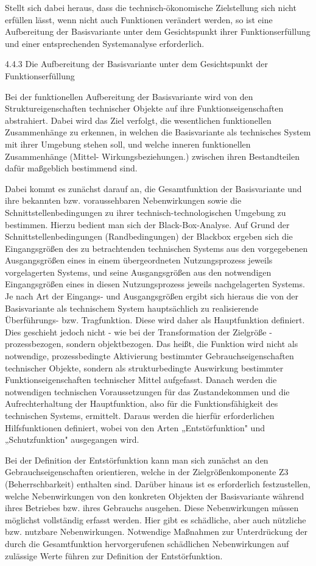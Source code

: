 \documentclass[12pt,a4paper]{article}
\begin{document}
Stellt sich dabei heraus, dass die technisch-ökonomische Zielstellung sich nicht erfüllen lässt, wenn nicht auch Funktionen verändert werden, so ist eine Aufbereitung der Basisvariante unter dem Gesichtspunkt ihrer Funktionserfüllung und einer entsprechenden Systemanalyse erforderlich.


4.4.3  Die Aufbereitung der Basisvariante unter dem Gesichtspunkt der Funktionserfüllung

Bei der funktionellen Aufbereitung der Basisvariante wird von den Struktureigenschaften technischer Objekte auf ihre Funktionseigenschaften abstrahiert. Dabei wird das Ziel verfolgt, die wesentlichen funktionellen Zusammenhänge zu erkennen, in welchen die Basisvariante als technisches System mit ihrer Umgebung stehen soll, und welche inneren funktionellen Zusammenhänge (Mittel- Wirkungsbeziehungen.) zwischen ihren Bestandteilen dafür maßgeblich bestimmend sind.

Dabei kommt es zunächst darauf an, die Gesamtfunktion der Basisvariante und ihre bekannten bzw. voraussehbaren Nebenwirkungen sowie die Schnittstellenbedingungen zu ihrer technisch-technologischen Umgebung zu bestimmen. Hierzu bedient man sich der Black-Box-Analyse. Auf Grund der Schnittstellenbedingungen (Randbedingungen) der Blackbox ergeben sich die Eingangsgrößen des zu betrachtenden technischen Systems aus den vorgegebenen Ausgangs­größen eines in einem übergeordneten Nutzungsprozess jeweils vorgelagerten Systems, und seine Ausgangsgrößen aus den notwendigen Eingangsgrößen eines in diesen Nutzungsprozess jeweils nachgelagerten Systems. Je nach Art der Eingangs- und Ausgangsgrößen ergibt sich hieraus die von der Basisvariante als technischem System hauptsächlich zu realisierende Überführungs- bzw. Tragfunktion. Diese wird daher als Hauptfunktion definiert. Dies geschieht jedoch nicht - wie bei der Transformation der Zielgröße - prozessbezogen, sondern objektbezogen. Das heißt, die Funktion wird nicht als notwendige, prozessbedingte Aktivierung bestimmter Gebrauchs­eigenschaften technischer Objekte, sondern als strukturbedingte Auswirkung bestimmter Funktionseigenschaften technischer Mittel aufgefasst. Danach werden die notwendigen technischen Voraussetzungen für das Zustandekommen und die Aufrechterhaltung der Hauptfunktion, also für die Funktionsfähigkeit des technischen Systems, ermittelt. Daraus werden die hierfür erforderlichen Hilfsfunktionen definiert, wobei von den Arten „Entstörfunktion" und „Schutzfunktion" ausgegangen wird.

Bei der Definition der Entstörfunktion kann man sich zunächst an den Gebrauchseigenschaften orientieren, welche in der Zielgrößenkomponente Z3 (Beherrschbarkeit) enthalten sind. Darüber hinaus ist es erforderlich festzustellen, welche Nebenwirkungen von den konkreten Objekten der Basisvariante während ihres Betriebes bzw. ihres Gebrauchs ausgehen. Diese Nebenwirkungen müssen möglichst vollständig erfasst werden. Hier gibt es schädliche, aber auch nützliche bzw. nutzbare Nebenwirkungen. Notwendige Maßnahmen zur Unterdrückung der durch die Gesamtfunktion hervorgerufenen schädlichen Nebenwirkungen auf zulässige Werte führen zur Definition der Entstörfunktion.
\end{document}
